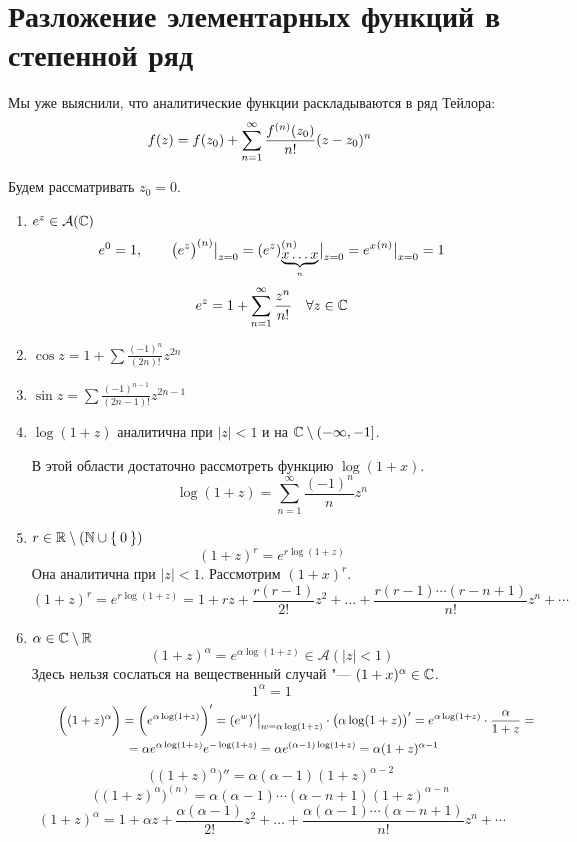 \section{Разложение элементарных функций в степенной ряд}

Мы уже выяснили, что аналитические функции раскладываются в ряд Тейлора:
$$ f(z) = f(z_0) + \sum_{n = 1}^\infty \frac{{f}^{({n})}(z_0)}{n!}(z - z_0)^n $$

Будем рассматривать $ z_0 = 0 $.
\begin{enumerate}
	\item $ e^z \in \mathcal A(\mathbb{C}) $
	$$ e^0 = 1, \qquad {\big(e^z \big)}^{({n})}\big|_{z = 0}^{} = {(e^z)}^{({n})}_{\underbrace{x\dots x}_n}\big|_{z = 0}^{} = {e^x}^{({n})}\big|_{x = 0}^{} = 1 $$
	$$ e^z = 1 + \sum_{n = 1}^\infty \frac{z^n}{n!} \quad \forall z \in \mathbb{C} $$
	\item $ \cos z = 1 + \sum \frac{(-1)^n}{(2n)!} z^{2n} $
	\item $ \sin z = \sum \frac{(-1)^{n - 1}}{(2n - 1)!} z^{2n - 1} $
	\item $ \log (1 + z) $ аналитична при $ |z| < 1 $ и на $ \mathbb{C} \setminus (-\infty, -1] $.

	В этой области достаточно рассмотреть функцию $ \log (1 + x) $.
	$$ \log(1 + z) = \sum_{n = 1}^\infty \frac{(-1)^n}{n}z^n $$
	\item $ r \in \mathbb{R} \setminus (\mathbb{N} \cup \Set 0) $
	$$ (1 + z)^r = e^{r \log(1 + z)} $$
	Она аналитична при $ |z| < 1 $. Рассмотрим $ (1 + x)^r $.
	$$ (1 + z)^r = e^{r \log(1 + z)} = 1 + rz + \frac{r(r - 1)}{2!}z^2 + \dots + \frac{r(r - 1) \cdots (r - n + 1)}{n!} z^n + \cdots $$
	\item $ \alpha \in \mathbb{C} \setminus \mathbb{R} $
	$$ (1 + z)^\alpha = e^{\alpha \log(1 + z)} \in \mathcal A(|z| < 1) $$
	Здесь нельзя сослаться на вещественный случай "--- $ (1 + x)^\alpha \in \mathbb{C} $.
	$$ 1^\alpha = 1 $$
	\begin{multline*}
		\qquad \bigg( (1 + z)^\alpha \bigg) = \bigg( e^{\alpha \log(1 + z)} \bigg)' = (e^w)'\big|_{w = \alpha \log(1 + z)}^{} \cdot \big( \alpha \log(1 + z) \big)' = e^{\alpha \log(1 + z)} \cdot \frac\alpha{1 + z} = \\
		= \alpha e^{\alpha \log(1 + z)} e^{-\log(1 + z)} = \alpha e^{(\alpha - 1) \log(1 + z)} = \alpha(1 + z)^{\alpha - 1}
	\end{multline*}
	$$ \bigg( (1 + z)^\alpha \bigg)'' = \alpha(\alpha - 1)(1 + z)^{\alpha - 2} $$
	$$ \bigg( (1 + z)^\alpha \bigg)^{(n)} = \alpha(\alpha - 1) \cdots (\alpha - n + 1)(1 + z)^{\alpha - n} $$
	$$ (1 + z)^\alpha = 1 + \alpha z + \frac{\alpha(\alpha - 1)}{2!} z^2 + \dots + \frac{\alpha(\alpha - 1) \cdots (\alpha - n + 1)}{n!} z^n + \cdots $$
\end{enumerate}


